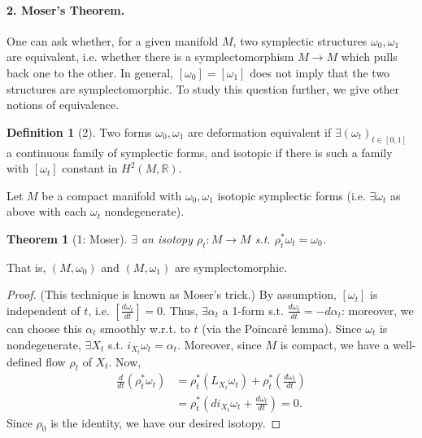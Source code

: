 \documentclass[UTF8,11pt]{ctexart}
\newtheorem*{theorem}{Theorem}
\theoremstyle{definition}
\newtheorem*{definition}{Definition}
\newcommand{\R}{\mathbb R}
\begin{document}
\paragraph{2. Moser's Theorem.}
One can ask whether, for a given manifold $M$, two symplectic structures $\omega_0,\omega_1$ are equivalent, i.e. whether there is a symplectomorphism $M\to M$ which pulls back one to the other. In general, $[\omega_0]=[\omega_1]$ does not imply that the two structures are symplectomorphic. To study this question further, we give other notions of equivalence.
\begin{definition}[2]
Two forms $\omega_0,\omega_1$ are deformation equivalent if $\exists(\omega_t)_{t\in[0,1]}$ a continuous family of symplectic forms, and isotopic if there is such a family with $[\omega_t]$ constant in $H^2(M,\R)$.
\end{definition}
Let $M$ be a compact manifold with $\omega_0,\omega_1$ isotopic symplectic forms (i.e. $\exists\omega_t$ as above with each $\omega_t$ nondegenerate).
\begin{theorem}[1: Moser]
$\exists$ an isotopy $\rho_t:M\to M$ s.t. $\rho_t^*\omega_t=\omega_0$.
\end{theorem}
That is, $(M,\omega_0)$ and $(M,\omega_1)$ are symplectomorphic.
\begin{proof}
(This technique is known as Moser's trick.) By assumption, $[\omega_t]$ is independent of $t$, i.e. $[\frac{d\omega_t}{dt}]=0$. Thus, $\exists\alpha_t$ a 1-form s.t. $\frac{d\omega_t}{dt}=-d\alpha_t$: moreover, we can choose this $\alpha_t$ smoothly w.r.t. to $t$ (via the Poincaré lemma). Since $\omega_t$ is nondegenerate, $\exists X_t$ s.t. $i_{X_t}\omega_t=\alpha_t$. Moreover, since $M$ is compact, we have a well-defined flow $\rho_t$ of $X_t$. Now,
\begin{align*}
\frac{d}{dt}(\rho_t^*\omega_t)
&=\rho_t^*(L_{X_t}\omega_t)+\rho_t^*\left(\frac{d\omega_t}{dt}\right)\\
&=\rho_t^*\left(di_{X_t}\omega_t+\frac{d\omega_t}{dt}\right)=0.
\end{align*}
Since $\rho_0$ is the identity, we have our desired isotopy.
\end{proof}
\end{document}
